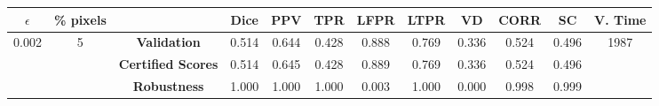 \begin{longtable}{ c  c | c | c  c  c  c  c  c  c c c}
\toprule \textbf{$\epsilon$} & \textbf{\% pixels} & & \textbf{Dice} & \textbf{PPV} & \textbf{TPR} & \textbf{LFPR} & \textbf{LTPR} & \textbf{VD} & \textbf{CORR} & \textbf{SC} & \textbf{V. Time} \\
\midrule 
\multirow{3}{*}{0.002}  & \multirow{3}{*}{5} &\textbf{Validation} & 0.514 & 0.644 & 0.428 & 0.888 & 0.769 & 0.336 & 0.524 & 0.496 & \multirow{3}{*}{1987} \\
 & & \textbf{Certified Scores} & 0.514 & 0.645 & 0.428 & 0.889 & 0.769 & 0.336 & 0.524 & 0.496 & \\
& & \textbf{Robustness} & 1.000 & 1.000 & 1.000 & 0.003 & 1.000 & 0.000 & 0.998 & 0.999 & \\
\end{longtable}